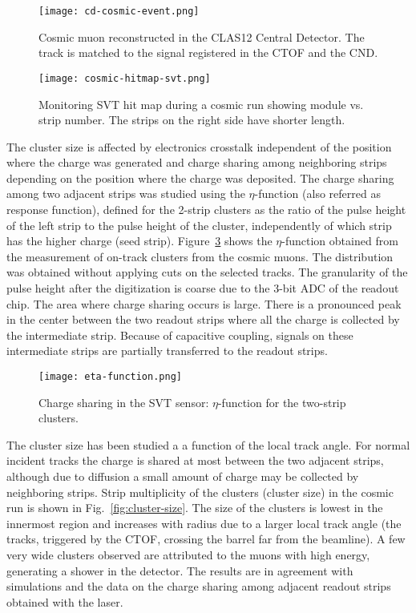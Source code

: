 \begin{figure}[hbt] 
\centering 
\texttt{[image: cd-cosmic-event.png]}
\caption{Cosmic muon reconstructed in the CLAS12 Central Detector. The track is matched to the signal registered in the CTOF and the CND.}
\label{fig:cd-cosmic-event}
\end{figure}

\begin{figure}[hbt] 
\centering 
\texttt{[image: cosmic-hitmap-svt.png]}
\caption{Monitoring SVT hit map during a cosmic run showing module vs. strip number. The strips on the right side have shorter length.}
\label{fig:cosmic-hitmap-svt}
\end{figure}

The cluster size is affected by electronics crosstalk independent of the position where the charge was generated and charge sharing among neighboring strips depending on the position where the charge was deposited. The charge sharing among two adjacent strips was studied using the $\eta$-function (also referred as response function), defined for the 2-strip clusters as the ratio of the pulse height of the left strip to the pulse height of the cluster, independently of which strip has the higher charge (seed strip). Figure~\ref{fig:eta-function} shows the  $\eta$-function obtained from the measurement of on-track clusters from the cosmic muons. The distribution was obtained without applying cuts on the selected tracks. The granularity of the pulse height after the digitization is coarse due to the 3-bit ADC of the readout chip. The area where charge sharing occurs is large. There is a pronounced peak in the center between the two readout strips where all the charge is collected by the intermediate strip. Because of capacitive coupling, signals on these intermediate strips are partially transferred to the readout strips.

\begin{figure}[hbt] 
\centering 
\texttt{[image: eta-function.png]}
\caption{Charge sharing in the SVT sensor: $\eta$-function for the two-strip clusters.}
\label{fig:eta-function}
\end{figure}

The cluster size has been studied a a function of the local track angle. For normal incident tracks the charge is shared at most between the two adjacent strips, although due to diffusion a small amount of charge may be collected by neighboring strips. Strip multiplicity of the clusters (cluster size) in the cosmic run is shown in Fig.~\ref{fig:cluster-size}. The size of the clusters is lowest in the innermost region and increases with radius due to a larger local track angle (the tracks, triggered by the CTOF, crossing the barrel far from the beamline). A few very wide clusters observed are attributed to the muons with high energy, generating a shower in the detector. The results are in agreement with simulations and the data on the charge sharing among adjacent readout strips obtained with the laser.


